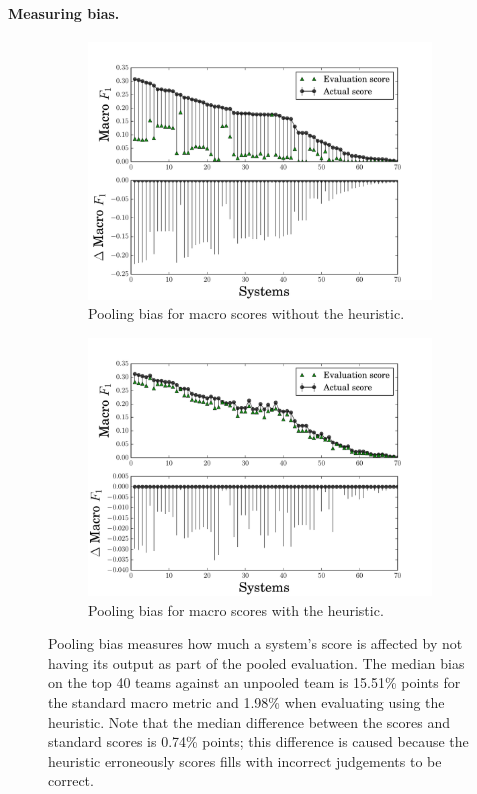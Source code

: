 \paragraph{Measuring bias.}
\begin{figure}[t]
  \begin{subfigure}{\columnwidth}
  \includegraphics[width=\columnwidth]{figures/pooling_bias_closed-world}
  \caption{Pooling bias for macro \fone{} scores without the \anydoc{} heuristic.}
  \end{subfigure}
  \begin{subfigure}{\columnwidth}
  \includegraphics[width=\columnwidth]{figures/pooling_bias_anydoc}
  \caption{Pooling bias for macro \fone{} scores with the \anydoc{} heuristic.}
  \end{subfigure}
  \caption{\label{fig:pooling-bias} Pooling bias measures how much a system's score is affected by not having its output as part of the pooled evaluation.
  The median bias on the top 40 teams against an unpooled team is 15.51\% points for the standard macro \fone{} metric and 1.98\% when evaluating using the \anydoc{} heuristic.
  Note that the median difference between the \anydoc{} scores and standard scores is 0.74\% points; this difference is caused because the \anydoc{} heuristic erroneously scores fills with incorrect judgements to be correct.}
\end{figure}

